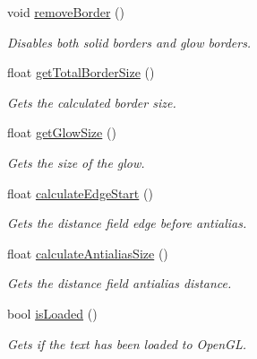 \begin{DoxyCompactItemize}
void \hyperlink{classflounder_1_1text_a55496b7300a9fd68d56f9ecf7f9351d8}{remove\+Border} ()
\begin{DoxyCompactList}\small\item\em Disables both solid borders and glow borders. \end{DoxyCompactList}\item 
float \hyperlink{classflounder_1_1text_a374447968e82dd7e58e1cfb84c4adfb6}{get\+Total\+Border\+Size} ()
\begin{DoxyCompactList}\small\item\em Gets the calculated border size. \end{DoxyCompactList}\item 
float \hyperlink{classflounder_1_1text_ad4c9fe99e6285ba919a21cebb278472b}{get\+Glow\+Size} ()
\begin{DoxyCompactList}\small\item\em Gets the size of the glow. \end{DoxyCompactList}\item 
float \hyperlink{classflounder_1_1text_a2a2ae8e21f3813120d01664ae1f6b946}{calculate\+Edge\+Start} ()
\begin{DoxyCompactList}\small\item\em Gets the distance field edge before antialias. \end{DoxyCompactList}\item 
float \hyperlink{classflounder_1_1text_ade6f72f44e758528317072049dfc9248}{calculate\+Antialias\+Size} ()
\begin{DoxyCompactList}\small\item\em Gets the distance field antialias distance. \end{DoxyCompactList}\item 
bool \hyperlink{classflounder_1_1text_adb04bc6937cf7d117c489947bbff7635}{is\+Loaded} ()
\begin{DoxyCompactList}\small\item\em Gets if the text has been loaded to Open\+GL. \end{DoxyCompactList}\end{DoxyCompactItemize}
